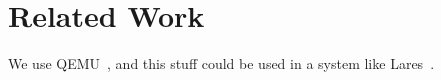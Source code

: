 \section{Related Work}

We use QEMU~\cite{Bellard:2005}, and this stuff could be used in a system like Lares~\cite{payne:2008}.
